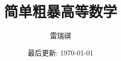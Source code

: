 \documentclass[a4paper,12pt]{article}
\begin{document}
\begin{CJK*}{UTF8}{gbsn}

\author{雷瑞祺}
\title{简单粗暴高等数学}
\date{最后更新: \today}

\maketitle
\tableofcontents




\end{CJK*}
\end{document}

